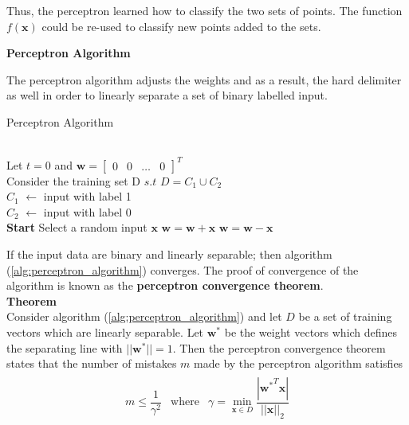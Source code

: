 Thus, the perceptron learned how to classify the two sets of points. The function $f(\textbf{x})$ could be re-used to classify new points added to the sets.
\vspace{15mm}

\noindent\textbf{Perceptron Algorithm}

\noindent The perceptron algorithm adjusts the weights and as a result, the hard delimiter as well in order to linearly separate a set of binary labelled input.

\begin{algorithm}[H]
\caption{Perceptron Algorithm}\label{alg:perceptron_algorithm}
\begin{algorithmic}[1]
\Require \\
Let $t=0$ and $\textbf{w} = \begin{bmatrix}
  0 & 0 & \dots & 0
\end{bmatrix}^T$ \\
Consider the training set D $s.t$ $D = C_1 \cup C_2$  \\
$C_1$ $\leftarrow$ input with label 1 \\
$C_2$ $\leftarrow$ input with label 0\\
\textbf{Start}
  \State Select a random input $\textbf{x}$
  \State $\textbf{w} = \textbf{w} + \textbf{x}$
  \EndIf
  \State $\textbf{w} = \textbf{w} - \textbf{x}$
  \EndIf
\EndWhile
\end{algorithmic}
\end{algorithm}
\noindent If the input data are binary and linearly separable; then algorithm (\ref{alg:perceptron_algorithm}) converges. The proof of convergence of the algorithm is known as the \textbf{perceptron convergence theorem}.\\
\textbf{Theorem}\\
Consider algorithm (\ref{alg:perceptron_algorithm}) and let $D$ be a set of training vectors which are linearly separable. Let $\textbf{w}^{*}$ be the weight vectors which defines the separating line with $||\textbf{w}^{*}|| = 1$. Then the perceptron convergence theorem states that the number of mistakes $m$ made by the perceptron algorithm satisfies 
\begin{align}
  \begin{matrix}
    m \leq \dfrac{1}{\gamma^2} & \text{where} & \gamma = \underset{\textbf{x}\in D}{\min} \dfrac{|{\textbf{w}^*}^T\textbf{x}|}{||\textbf{x}||_2}
  \end{matrix}
\end{align}
